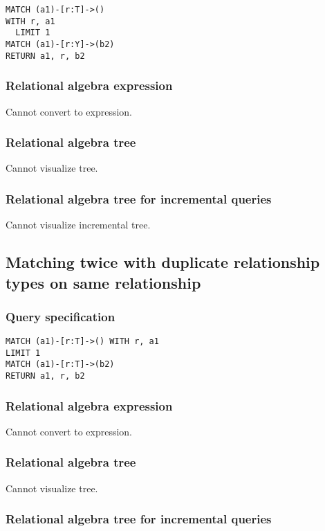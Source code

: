 \begin{lstlisting}
MATCH (a1)-[r:T]->()
WITH r, a1
  LIMIT 1
MATCH (a1)-[r:Y]->(b2)
RETURN a1, r, b2
\end{lstlisting}

\subsubsection*{Relational algebra expression}

Cannot convert to expression.

\subsubsection*{Relational algebra tree}

Cannot visualize tree.

\subsubsection*{Relational algebra tree for incremental queries}

Cannot visualize incremental tree.

\subsection{Matching twice with duplicate relationship types on same relationship}

\subsubsection*{Query specification}

\begin{lstlisting}
MATCH (a1)-[r:T]->() WITH r, a1
LIMIT 1
MATCH (a1)-[r:T]->(b2)
RETURN a1, r, b2
\end{lstlisting}

\subsubsection*{Relational algebra expression}

Cannot convert to expression.

\subsubsection*{Relational algebra tree}

Cannot visualize tree.

\subsubsection*{Relational algebra tree for incremental queries}

